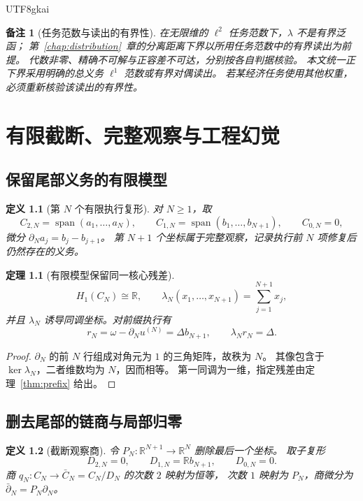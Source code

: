 \documentclass[12pt,a4paper,openany]{report}
\newtheorem{definition}{定义}[chapter]
\newtheorem{theorem}{定理}[chapter]
\newtheorem{remark}{备注}[chapter]
\numberwithin{equation}{chapter}
\newcommand{\RR}{\mathbb R}
\newcommand{\spanof}{\operatorname{span}}
\begin{document}
\begin{CJK*}{UTF8}{gkai}
\begin{remark}[任务范数与读出的有界性]
在无限维的 $\ell^2$ 任务范数下，$\lambda$ 不是有界泛函；
第~\ref{chap:distribution}~章的分离距离下界以所用任务范数中的有界读出为前提。
代数非零、精确不可解与正容差不可达，分别按各自判据核验。
本文统一正下界采用明确的总义务 $\ell^1$ 范数或有界对偶读出。
若某经济任务使用其他权重，必须重新核验该读出的有界性。
\end{remark}

\chapter{有限截断、完整观察与工程幻觉}
\label{chap:hallucination}

\section{保留尾部义务的有限模型}

\begin{definition}[第 $N$ 个有限执行复形]
对 $N\ge1$，取
\[
 C_{2,N}=\spanof(a_1,\ldots,a_N),\qquad
 C_{1,N}=\spanof(b_1,\ldots,b_{N+1}),\qquad C_{0,N}=0,
\]
微分 $\partial_Na_j=b_j-b_{j+1}$。
第 $N+1$ 个坐标属于完整观察，记录执行前 $N$ 项修复后仍然存在的义务。
\end{definition}

\begin{theorem}[有限模型保留同一核心残差]
\[
 H_1(C_N)\cong\RR,\qquad
 \lambda_N(x_1,\ldots,x_{N+1})=\sum_{j=1}^{N+1}x_j,
\]
并且 $\lambda_N$ 诱导同调坐标。对前缀执行有
\[
 r_N=\omega-\partial_Nu^{(N)}=\Delta b_{N+1},\qquad
 \lambda_Nr_N=\Delta.
\]
\end{theorem}
\begin{proof}
$\partial_N$ 的前 $N$ 行组成对角元为 $1$ 的三角矩阵，故秩为 $N$。
其像包含于 $\ker\lambda_N$，二者维数均为 $N$，因而相等。
第一同调为一维，指定残差由定理~\ref{thm:prefix} 给出。
\end{proof}

\section{删去尾部的链商与局部归零}

\begin{definition}[截断观察商]
令 $P_N:\RR^{N+1}\to\RR^N$ 删除最后一个坐标。
取子复形
\[
 D_{2,N}=0,\qquad D_{1,N}=\RR b_{N+1},\qquad D_{0,N}=0.
\]
商 $q_N:C_N\to\bar C_N=C_N/D_N$ 的次数 $2$ 映射为恒等，
次数 $1$ 映射为 $P_N$，商微分为 $\bar\partial_N=P_N\partial_N$。
\end{definition}


\end{CJK*}
\end{document}

